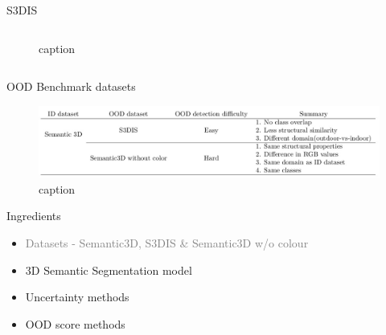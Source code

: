 \documentclass[aspectratio=169]{beamer}
\begin{document}
\begin{frame}{S3DIS}
\begin{columns}
\begin{column}{0.4\textwidth}
\begin{figure}
                \caption{caption}
                \label{fig:s3dis_sample_images}
            \end{figure}
        \end{column}
    \end{columns}
\end{frame}
\begin{frame}{OOD Benchmark datasets}
    \begin{figure}
        \centering
        \includegraphics[scale=0.33]{images/benchmark_table.jpg}
        \caption{caption}
        \label{fig:benchmark_table}
    \end{figure}
\end{frame}
\begin{frame}[noframenumbering]{Ingredients}
    \begin{itemize}
        \item \textcolor{gray}{Datasets - Semantic3D, S3DIS \& Semantic3D w/o colour}
        \item 3D Semantic Segmentation model
        \item Uncertainty methods
        \item OOD score methods
    \end{itemize}
\end{frame}
\end{document}

